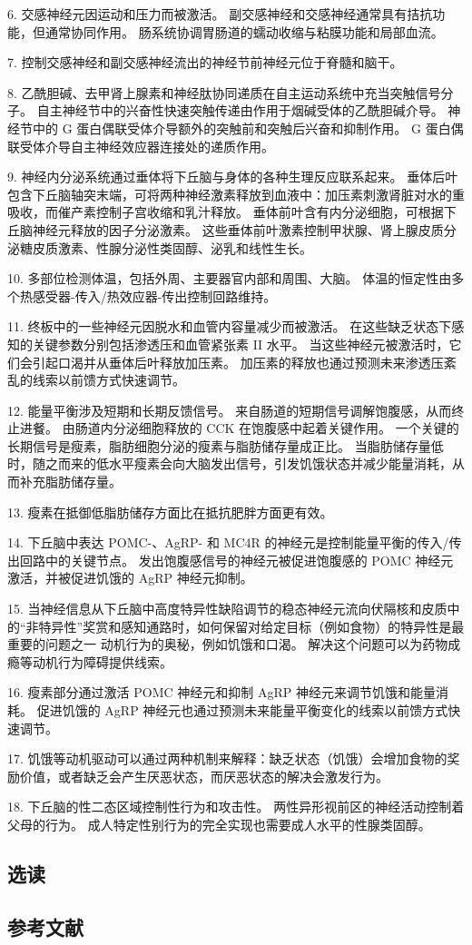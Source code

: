 6. 交感神经元因运动和压力而被激活。 副交感神经和交感神经通常具有拮抗功能，但通常协同作用。 肠系统协调胃肠道的蠕动收缩与粘膜功能和局部血流。 

7. 控制交感神经和副交感神经流出的神经节前神经元位于脊髓和脑干。 

8. 乙酰胆碱、去甲肾上腺素和神经肽协同递质在自主运动系统中充当突触信号分子。 自主神经节中的兴奋性快速突触传递由作用于烟碱受体的乙酰胆碱介导。 神经节中的 G 蛋白偶联受体介导额外的突触前和突触后兴奋和抑制作用。 G 蛋白偶联受体介导自主神经效应器连接处的递质作用。 

9. 神经内分泌系统通过垂体将下丘脑与身体的各种生理反应联系起来。 垂体后叶包含下丘脑轴突末端，可将两种神经激素释放到血液中：加压素刺激肾脏对水的重吸收，而催产素控制子宫收缩和乳汁释放。 垂体前叶含有内分泌细胞，可根据下丘脑神经元释放的因子分泌激素。 这些垂体前叶激素控制甲状腺、肾上腺皮质分泌糖皮质激素、性腺分泌性类固醇、泌乳和线性生长。

10. 多部位检测体温，包括外周、主要器官内部和周围、大脑。 体温的恒定性由多个热感受器-传入/热效应器-传出控制回路维持。 

11. 终板中的一些神经元因脱水和血管内容量减少而被激活。 在这些缺乏状态下感知的关键参数分别包括渗透压和血管紧张素 II 水平。 当这些神经元被激活时，它们会引起口渴并从垂体后叶释放加压素。 加压素的释放也通过预测未来渗透压紊乱的线索以前馈方式快速调节。 

12. 能量平衡涉及短期和长期反馈信号。 来自肠道的短期信号调解饱腹感，从而终止进餐。 由肠道内分泌细胞释放的 CCK 在饱腹感中起着关键作用。 一个关键的长期信号是瘦素，脂肪细胞分泌的瘦素与脂肪储存量成正比。 当脂肪储存量低时，随之而来的低水平瘦素会向大脑发出信号，引发饥饿状态并减少能量消耗，从而补充脂肪储存量。 

13. 瘦素在抵御低脂肪储存方面比在抵抗肥胖方面更有效。 

14. 下丘脑中表达 POMC-、AgRP- 和 MC4R 的神经元是控制能量平衡的传入/传出回路中的关键节点。 发出饱腹感信号的神经元被促进饱腹感的 POMC 神经元激活，并被促进饥饿的 AgRP 神经元抑制。 

15. 当神经信息从下丘脑中高度特异性缺陷调节的稳态神经元流向伏隔核和皮质中的“非特异性”奖赏和感知通路时，如何保留对给定目标（例如食物）的特异性是最重要的问题之一 动机行为的奥秘，例如饥饿和口渴。 解决这个问题可以为药物成瘾等动机行为障碍提供线索。 

16. 瘦素部分通过激活 POMC 神经元和抑制 AgRP 神经元来调节饥饿和能量消耗。 促进饥饿的 AgRP 神经元也通过预测未来能量平衡变化的线索以前馈方式快速调节。 

17. 饥饿等动机驱动可以通过两种机制来解释：缺乏状态（饥饿）会增加食物的奖励价值，或者缺乏会产生厌恶状态，而厌恶状态的解决会激发行为。 

18. 下丘脑的性二态区域控制性行为和攻击性。 两性异形视前区的神经活动控制着父母的行为。 成人特定性别行为的完全实现也需要成人水平的性腺类固醇。

\subsection{选读}
\subsection{参考文献}